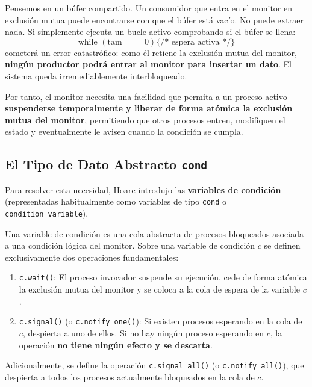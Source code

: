 \begin{ejemplo}
Pensemos en un búfer compartido. Un consumidor que entra en el monitor en exclusión mutua puede encontrarse con que el búfer está vacío. No puede extraer nada. Si simplemente ejecuta un bucle activo comprobando si el búfer se llena:
\[
\text{while } (\text{tam} == 0) \{ \text{/* espera activa */} \}
\]
cometerá un error catastrófico: como él retiene la exclusión mutua del monitor, \textbf{ningún productor podrá entrar al monitor para insertar un dato}. El sistema queda irremediablemente interbloqueado.
\end{ejemplo}

Por tanto, el monitor necesita una facilidad que permita a un proceso activo \textbf{suspenderse temporalmente y liberar de forma atómica la exclusión mutua del monitor}, permitiendo que otros procesos entren, modifiquen el estado y eventualmente le avisen cuando la condición se cumpla.

\subsection{El Tipo de Dato Abstracto \texttt{cond}}
Para resolver esta necesidad, Hoare introdujo las \textbf{variables de condición} (representadas habitualmente como variables de tipo \texttt{cond} o \texttt{condition\_variable}).

\begin{definicion}
Una variable de condición es una cola abstracta de procesos bloqueados asociada a una condición lógica del monitor. Sobre una variable de condición $c$ se definen exclusivamente dos operaciones fundamentales:
\begin{enumerate}[leftmargin=*]
    \item \texttt{c.wait()}: El proceso invocador suspende su ejecución, cede de forma atómica la exclusión mutua del monitor y se coloca a la cola de espera de la variable $c$.
    \item \texttt{c.signal()} (o \texttt{c.notify\_one()}): Si existen procesos esperando en la cola de $c$, despierta a uno de ellos. Si no hay ningún proceso esperando en $c$, la operación \textbf{no tiene ningún efecto y se descarta}.
\end{enumerate}
Adicionalmente, se define la operación \texttt{c.signal\_all()} (o \texttt{c.notify\_all()}), que despierta a todos los procesos actualmente bloqueados en la cola de $c$.
\end{definicion}

